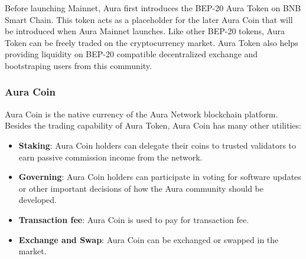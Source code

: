 \documentclass[11pt, titlepage]{article}
\begin{document}
Before launching Mainnet, Aura first introduces the BEP-20 Aura Token on BNB Smart Chain. This token acts as a placeholder for the later Aura Coin that will be introduced when Aura Mainnet launches. Like other BEP-20 tokens, Aura Token can be freely traded on the cryptocurrency market. Aura Token also helps providing liquidity on BEP-20 compatible decentralized exchange and bootstraping users from this community.

\subsubsection{Aura Coin}
Aura Coin is the native currency of the Aura Network blockchain platform. Besides the trading capability of Aura Token, Aura Coin has many other utilities:

\begin{itemize}
    \item \textbf{Staking}: Aura Coin holders can delegate their coins to trusted validators to earn passive commission income from the network.
    \item \textbf{Governing}: Aura Coin holders can participate in voting for software updates or other important decisions of how the Aura community should be developed.
    \item \textbf{Transaction fee}: Aura Coin is used to pay for transaction fee.
    \item \textbf{Exchange and Swap}: Aura Coin can be exchanged or swapped in the market.
\end{itemize}
\end{document}
